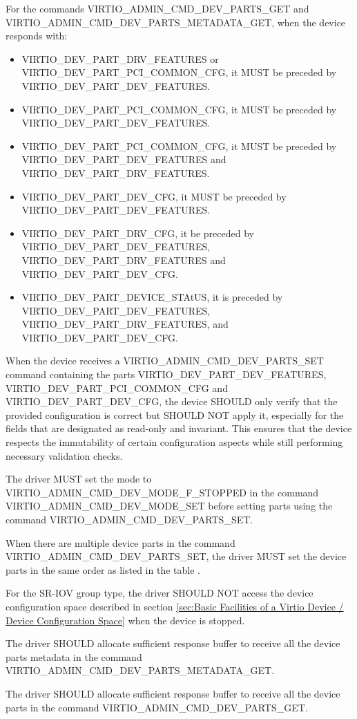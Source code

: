 For the commands VIRTIO_ADMIN_CMD_DEV_PARTS_GET and
VIRTIO_ADMIN_CMD_DEV_PARTS_METADATA_GET, when the device responds with:
\begin{itemize}
\item
VIRTIO_DEV_PART_DRV_FEATURES or VIRTIO_DEV_PART_PCI_COMMON_CFG, it MUST be
preceded by VIRTIO_DEV_PART_DEV_FEATURES.

\item VIRTIO_DEV_PART_PCI_COMMON_CFG, it MUST be preceded by
VIRTIO_DEV_PART_DEV_FEATURES.

\item VIRTIO_DEV_PART_PCI_COMMON_CFG, it MUST be preceded by
VIRTIO_DEV_PART_DEV_FEATURES and VIRTIO_DEV_PART_DRV_FEATURES.

\item VIRTIO_DEV_PART_DEV_CFG, it MUST be preceded by VIRTIO_DEV_PART_DEV_FEATURES.

\item VIRTIO_DEV_PART_DRV_CFG, it be preceded by VIRTIO_DEV_PART_DEV_FEATURES,
VIRTIO_DEV_PART_DRV_FEATURES and VIRTIO_DEV_PART_DEV_CFG.

\item VIRTIO_DEV_PART_DEVICE_STAtUS, it is preceded by VIRTIO_DEV_PART_DEV_FEATURES,
VIRTIO_DEV_PART_DRV_FEATURES, and VIRTIO_DEV_PART_DEV_CFG.
\end{itemize}

When the device receives a VIRTIO_ADMIN_CMD_DEV_PARTS_SET command containing the
parts VIRTIO_DEV_PART_DEV_FEATURES, VIRTIO_DEV_PART_PCI_COMMON_CFG and
VIRTIO_DEV_PART_DEV_CFG, the device SHOULD only verify that the provided configuration is
correct but SHOULD NOT apply it, especially for the fields that are designated
as read-only and invariant. This ensures that the device respects the
immutability of certain configuration aspects while still performing necessary
validation checks.


The driver MUST set the mode to VIRTIO_ADMIN_CMD_DEV_MODE_F_STOPPED in
the command VIRTIO_ADMIN_CMD_DEV_MODE_SET before setting parts using the command
VIRTIO_ADMIN_CMD_DEV_PARTS_SET.

When there are multiple device parts in the command
VIRTIO_ADMIN_CMD_DEV_PARTS_SET, the driver MUST set the device parts in the same
order as listed in the table
.

For the SR-IOV group type, the driver SHOULD NOT access the device configuration
space described in section
\ref{sec:Basic Facilities of a Virtio Device / Device Configuration Space}
when the device is stopped.

The driver SHOULD allocate sufficient response buffer to receive all the device
parts metadata in the command VIRTIO_ADMIN_CMD_DEV_PARTS_METADATA_GET.

The driver SHOULD allocate sufficient response buffer to receive all the device
parts in the command VIRTIO_ADMIN_CMD_DEV_PARTS_GET.
